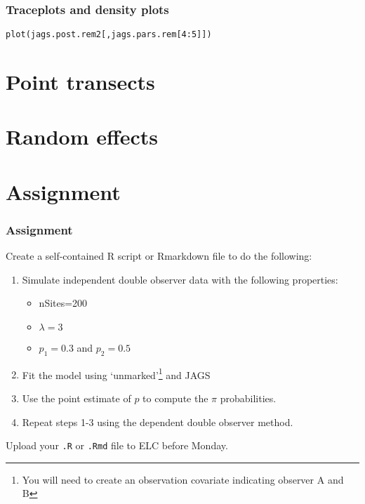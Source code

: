 \documentclass[color=usenames,dvipsnames]{beamer}\usepackage[]{graphicx}\usepackage[]{color}
\makeatletter
\newcommand{\hlnum}[1]{\textcolor[rgb]{0.69,0.494,0}{#1}}%
\newcommand{\hlopt}[1]{\textcolor[rgb]{0,0,0}{#1}}%
\newcommand{\hlstd}[1]{\textcolor[rgb]{0,0,0}{#1}}%
\newcommand{\hlkwd}[1]{\textcolor[rgb]{0.004,0.004,0.506}{#1}}%
\newenvironment{kframe}{%
 \def\at@end@of@kframe{}%
 \ifinner\ifhmode%
  \def\at@end@of@kframe{\end{minipage}}%
  \begin{minipage}{\columnwidth}%
 \fi\fi%
 \def\FrameCommand##1{\hskip\@totalleftmargin \hskip-\fboxsep
 \colorbox{shadecolor}{##1}\hskip-\fboxsep
     \hskip-\linewidth \hskip-\@totalleftmargin \hskip\columnwidth}%
 \MakeFramed {\advance\hsize-\width
   \@totalleftmargin\z@ \linewidth\hsize
   \@setminipage}}%
 {\par\unskip\endMakeFramed%
 \at@end@of@kframe}
\newenvironment{knitrout}{}{} %
\makeatother
\begin{document}
\begin{frame}[fragile]
  \frametitle{Traceplots and density plots}
\begin{knitrout}\footnotesize
{}\color{fgcolor}\begin{kframe}
\begin{alltt}
\hlkwd{plot}\hlstd{(jags.post.rem2[,jags.pars.rem[}\hlnum{4}\hlopt{:}\hlnum{5}\hlstd{]])}
\end{alltt}


{\ttfamily\noindent\bfseries\color{errorcolor}{\#\# Error in h(simpleError(msg, call)): error in evaluating the argument 'x' in selecting a method for function 'plot': object 'jags.post.rem2' not found}}\end{kframe}
\end{knitrout}
\end{frame}




\section{Point transects}



\section{Random effects}





\section{Assignment}




\begin{frame}[fragile]
  \frametitle{Assignment}
  \footnotesize
  Create a self-contained R script or Rmarkdown file
  to do the following:
  \vfill
  \begin{enumerate}
    \footnotesize
    \item Simulate \alert{independent} double observer data with the following
      properties:
      \begin{itemize}
        \item nSites=200
        \item $\lambda=3$
        \item $p_1=0.3$ and $p_2=0.5$
      \end{itemize}
    \item Fit the model using `unmarked'\footnote{\scriptsize You will
        need to create an observation covariate indicating observer A
        and B} and JAGS
    \item Use the point estimate of $p$ to compute the $\pi$ probabilities.
    \item Repeat steps 1-3 using the \alert{dependent} double observer
      method. 
  \end{enumerate}
  \vfill
  Upload your {\tt .R} or {\tt .Rmd} file to ELC before Monday. 
\end{frame}
\end{document}
